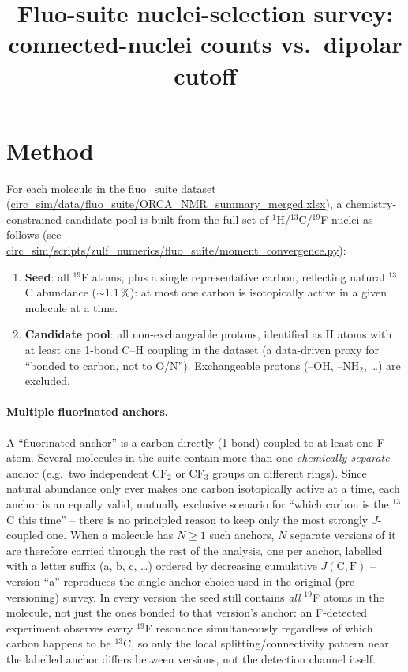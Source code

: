 \documentclass[11pt]{article}
\title{Fluo-suite nuclei-selection survey: connected-nuclei counts vs.\ dipolar cutoff}
\author{}
\date{}
\begin{document}
\maketitle

\section{Method}

For each molecule in the fluo\_suite dataset
(\url{circ_sim/data/fluo_suite/ORCA_NMR_summary_merged.xlsx}),
a chemistry-constrained candidate pool is built from the full set of $^{1}$H/$^{13}$C/$^{19}$F
nuclei as follows (see \url{circ_sim/scripts/zulf_numerics/fluo_suite/moment_convergence.py}):

\begin{enumerate}
\item \textbf{Seed}: all $^{19}$F atoms, plus a single representative carbon,
  reflecting natural $^{13}$C abundance ($\sim$1.1\,\%): at most one carbon
  is isotopically active in a given molecule at a time.
\item \textbf{Candidate pool}: all non-exchangeable protons, identified as
  H atoms with at least one 1-bond C--H coupling in the dataset (a
  data-driven proxy for ``bonded to carbon, not to O/N''). Exchangeable
  protons (–OH, –NH$_2$, \ldots) are excluded.
\end{enumerate}

\paragraph{Multiple fluorinated anchors.} A ``fluorinated anchor'' is a
carbon directly (1-bond) coupled to at least one F atom. Several molecules
in the suite contain more than one \emph{chemically separate} anchor (e.g.\
two independent CF$_2$ or CF$_3$ groups on different rings). Since natural
abundance only ever makes one carbon isotopically active at a time, each
anchor is an equally valid, mutually exclusive scenario for ``which carbon
is the $^{13}$C this time'' -- there is no principled reason to keep only
the most strongly $J$-coupled one. When a molecule has $N\geq 1$ such
anchors, $N$ separate versions of it are therefore carried through the rest
of the analysis, one per anchor, labelled with a letter suffix (a, b, c,
\ldots) ordered by decreasing cumulative $J(\mathrm{C,F})$ -- version ``a''
reproduces the single-anchor choice used in the original (pre-versioning)
survey. In every version the seed still contains \emph{all} $^{19}$F atoms
in the molecule, not just the ones bonded to that version's anchor: an
F-detected experiment observes every $^{19}$F resonance simultaneously
regardless of which carbon happens to be $^{13}$C, so only the local
splitting/connectivity pattern near the labelled anchor differs between
versions, not the detection channel itself.
\end{document}

